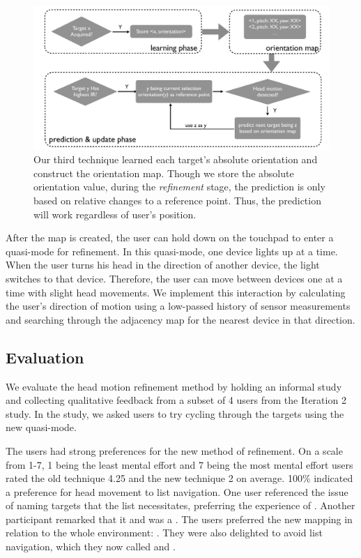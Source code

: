 \begin{figure}[t]
\centering
\includegraphics[width=1\columnwidth]{figures/third_technique3.pdf}
\caption{ Our third technique learned each target's absolute orientation and construct the orientation map. Though we store the absolute orientation value, during the {\em refinement} stage, the prediction is only based on relative changes to a reference point. Thus, the prediction will work regardless of user's position.}
\label{fig:third_technique}
\end{figure}

After the map is created, the user can hold down on the touchpad to enter a
quasi-mode for refinement. In this quasi-mode, one device lights up at a time. When the user turns his head in the direction of another device, the light switches to that device. Therefore, the user can move between devices one at a time with slight head movements. We implement this interaction by calculating the user's direction of motion using a low-passed history of sensor measurements and searching through the adjacency map for
the nearest device in that direction. 

\subsection{Evaluation}
We evaluate the head motion refinement method by holding an informal study and collecting qualitative feedback from a subset of 4 users from the Iteration 2 study. In the study, we asked users to try cycling through the targets using the new quasi-mode.

The users had strong preferences for the new method of refinement. On a scale from 1-7, 1 being the least mental effort and 7 being the most mental effort users rated the old technique 4.25 and the new technique 2 on average. 100\% indicated a preference for head movement to list navigation. One user referenced the issue of naming targets that the list necessitates, preferring the experience of . Another participant remarked that it  and was a . The users preferred the new mapping in relation to the whole environment: . They were also delighted to avoid list navigation, which they now called  and .
